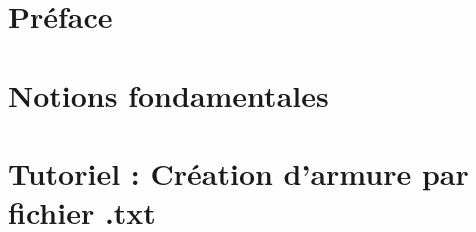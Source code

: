\documentclass[a4paper]{report}
\begin{document}



\tableofcontents


\chapter*{Préface}



\chapter{Notions fondamentales}



\chapter{Tutoriel : Création d'armure par fichier .txt}

\end{document}
